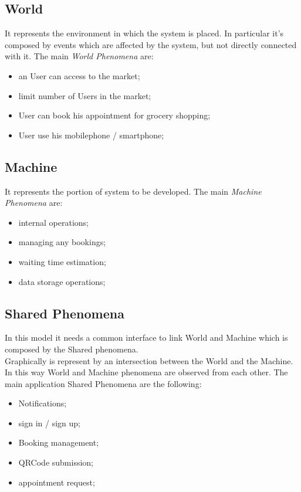 \subsection{World}

It represents the environment in which the system is placed. In particular it's composed by events which are affected by the system, but not directly connected with it.
The main \textit{World Phenomena} are:

\begin{itemize}
\item an User can access to the market;
\item limit number of Users in the market;
\item User can book his appointment for grocery shopping;
\item User use his mobilephone / smartphone;
\end{itemize}


\subsection{Machine}
It represents the portion of system to be developed.
The main \textit{Machine Phenomena} are:
\begin{itemize}
\item internal operations;
\item managing any bookings;
\item waiting time estimation;
\item data storage operations;
\end{itemize}
\subsection{Shared Phenomena} 
In this model it needs a common interface to link World and Machine which is composed by the Shared phenomena. \\
Graphically is represent by an intersection between the World and the Machine. In this way World and Machine phenomena are observed from each other.  
The main application Shared Phenomena are the following:
\begin{itemize}
\item Notifications;
\item sign in / sign up;
\item Booking management;
\item QRCode submission;
\item appointment request;
\end{itemize}

